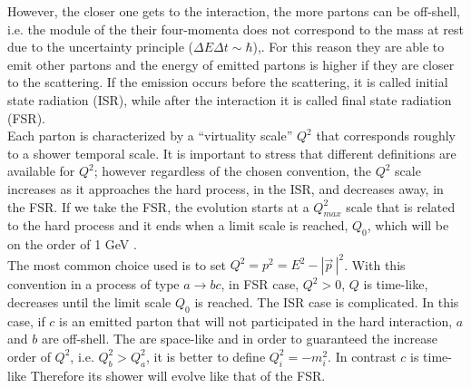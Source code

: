 However, the closer one gets to the interaction,  the more  partons can be off-shell, i.e. the module of the their four-momenta does not correspond to the mass at rest due to the uncertainty principle ($ \Delta E \Delta t \sim \hbar $),. 
For this reason they are able to emit other partons and  the energy of emitted partons is higher if they are closer to the scattering.
If the emission occurs before the scattering, it is called initial state radiation (ISR), while after the interaction it is called final state radiation (FSR). \\
Each parton  is characterized by a  ``virtuality scale'' $Q^2$ that corresponds roughly to a shower temporal scale.
It is important to stress that different definitions are available for $Q^2$; however regardless of the chosen convention, the $ Q^2 $ scale increases as it approaches the hard process,  in the ISR, and decreases away, in the FSR. If we take the FSR,  the evolution starts at a $ Q^2_ {max} $ scale that is related to the hard process and it ends when a limit scale is reached, $ Q_0 $, which will be on the order of 1 GeV .\\
The most common choice used is to set  $Q^2=p^2=E^2- |\vec{p}\,|^2$. With this convention in a process of type  $a \rightarrow bc$, in FSR case, $Q^2 >0$, 
$Q$ is time-like, decreases until the limit scale $ Q_0 $ is reached.
The ISR case is complicated. In this case, if $c$ is an emitted parton that will not participated in the hard interaction, $a$ and $b$ are off-shell. The are space-like and in order to guaranteed the increase order of $Q^2$,  i.e. $ Q_b^2> Q_a^2 $, it is better to define  $ Q_i^2 = -m_i^2 $. In contrast $c$ is time-like 
Therefore its shower will evolve like that of the FSR.

